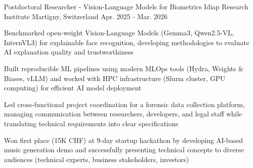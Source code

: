 

\begin{cventries}

\cventry
    {Postdoctoral Researcher - Vision-Language Models for Biometrics} %
    {Idiap Research Institute} %
    {Martigny, Switzerland} %
    {Apr. 2025 - Mar. 2026} %
    {
      \begin{cvitems} %
        \item {Benchmarked open-weight Vision-Language Models (Gemma3, Qwen2.5-VL, InternVL3) for explainable face recognition, developing methodologies to evaluate AI explanation quality and trustworthiness}
        \item {Built reproducible ML pipelines using modern MLOps tools (Hydra, Weights \& Biases, vLLM) and worked with HPC infrastructure (Slurm cluster, GPU computing) for efficient AI model deployment}
        \item {Led cross-functional project coordination for a forensic data collection platform, managing communication between researchers, developers, and legal staff while translating technical requirements into clear specifications}
        \item {Won first place (15K CHF) at 9-day startup hackathon by developing AI-based music generation demo and successfully presenting technical concepts to diverse audiences (technical experts, business stakeholders, investors)}
      \end{cvitems}
    }


\end{cventries}

